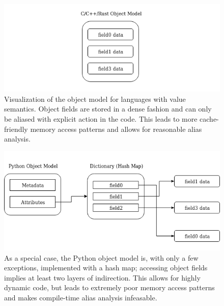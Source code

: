 \documentclass[nobib]{tufte-handout}
\begin{document}
\begin{figure}
\includegraphics[width=\linewidth]{images/CppObjectModel.png}
\caption{Visualization of the object model for languages with value semantics.  Object fields are stored in a dense fashion and can only be aliased with explicit action in the code.  This leads to more cache-friendly memory access patterns and allows for reasonable alias analysis.}
\label{fig:CppObjectModel}
\end{figure}

\begin{figure}
\includegraphics[width=\linewidth]{images/PythonObjectModel.png}
\caption{As a special case, the Python object model is, with only a few exceptions, implemented with a hash map; accessing object fields implies at least two layers of indirection.  This allows for highly dynamic code, but leads to extremely poor memory access patterns and makes compile-time alias analysis infeasable.} 
\label{fig:PythonObjectModel}
\end{figure}
\end{document}
